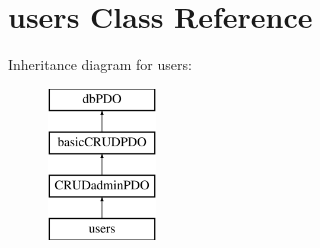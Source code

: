 \hypertarget{classusers}{\section{users Class Reference}
\label{classusers}
}
Inheritance diagram for users\-:\begin{figure}[H]
\begin{center}
\leavevmode
\includegraphics[height=4.000000cm]{classusers}
\end{center}
\end{figure}
